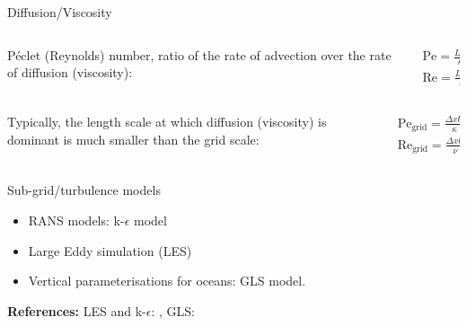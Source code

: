 \documentclass[12pt]{beamer}
\begin{document}
\begin{frame}{Diffusion/Viscosity}
      \vspace{-1em}
  \begin{columns}
    \begin{column}{0.8\textwidth}
      P\'eclet (Reynolds) number, ratio of the rate of advection over the rate of diffusion
      (viscosity):
    \end{column}%
    \begin{column}{0.2\textwidth}
      \vspace{-1em}
  \begin{gather*}
    \mathrm{Pe}=\frac{LU}\kappa\\
    \mathrm{Re}=\frac{LU}\nu
  \end{gather*}
    \end{column}
  \end{columns}
  \begin{columns}
    \begin{column}{0.7\textwidth}
  Typically, the length scale at which diffusion (viscosity) is dominant is much
  smaller than the grid scale:
    \end{column}%
    \begin{column}{0.3\textwidth}
  \begin{gather*}
        \mathrm{Pe}_{\text{grid}}=\frac{\Delta xU}\kappa\ \gg 1\\
        \mathrm{Re}_{\text{grid}}=\frac{\Delta xU}\nu \gg 1
  \end{gather*}
    \end{column}
  \end{columns}

  \begin{block}{Sub-grid/turbulence models}
    \begin{itemize}
      \item RANS models: k-$\epsilon$ model
      \item Large Eddy simulation (LES)
      \item Vertical parameterisations for oceans: GLS model.
    \end{itemize}
  \end{block}
  {\bf References:} LES and k-$\epsilon$: \citet{Pope2000,Wilcox1998},
  GLS: \citet{Hill2012,Umlauf2005}
\end{frame}
\end{document}
